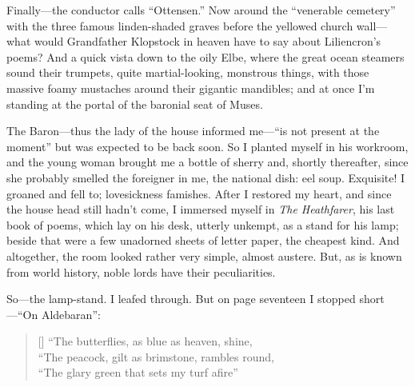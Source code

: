 \documentclass[12pt,a4paper]{article}
\begin{document}
Finally—the conductor calls “Ottensen.” Now around the “venerable cemetery” with the three famous linden-shaded graves before the yellowed church wall—what would Grandfather Klopstock in heaven have to say about Liliencron’s poems? And a quick vista down to the oily Elbe, where the great ocean steamers sound their trumpets, quite martial-looking, monstrous things, with those massive foamy mustaches around their gigantic mandibles; and at once I’m standing at the portal of the baronial seat of Muses.

The Baron—thus the lady of the house informed me—“is not present at the moment” but was expected to be back soon. So I planted myself in his workroom, and the young woman brought me a bottle of sherry and, shortly thereafter, since she probably smelled the foreigner in me, the national dish: eel soup. Exquisite! I groaned and fell to; lovesickness famishes. After I restored my heart, and since the house head still hadn’t come, I immersed myself in \textit{The Heathfarer}, his last book of poems, which lay on his desk, utterly unkempt, as a stand for his lamp; beside that were a few unadorned sheets of letter paper, the cheapest kind. And altogether, the room looked rather very simple, almost austere. But, as is known from world history, noble lords have their peculiarities.

So—the lamp-stand. I leafed through. But on page seventeen I stopped short—“On Aldebaran”:
\settowidth{\versewidth}{“The peacock, gilt as brimstone, rambles round,}
\begin{verse}[\versewidth]
“The butterflies, as blue as heaven, shine, \\
“The peacock, gilt as brimstone, rambles round, \\
“The glary green that sets my turf afire” 
\end{verse}
\end{document}
